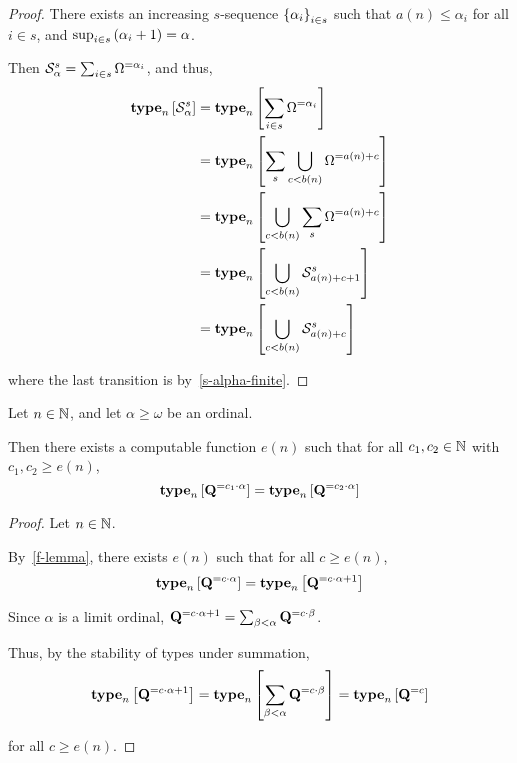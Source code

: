 \begin{proof}
    There exists an increasing $s$-sequence $\left\{ {\alpha_i} \right\}_{i \in s}$ such that
    $a(n) \le \alpha_i$ for all $i \in s$,
    and $\sup_{i \in s} \left( {\alpha_i + 1} \right) = \alpha$.

    Then $\mathcal{S}^{s}_{\alpha} = \sum_{i \in s} \Omega^{= \alpha_i}$,
    and thus,
    \begin{align*}
        \mathbf{type}_{n} \left[ {\mathcal{S}^{s}_{\alpha}} \right]
         & = \mathbf{type}_{n} \left[ {\sum_{i \in s} \Omega^{= \alpha_i}} \right]                   \\
         & = \mathbf{type}_{n} \left[ {\sum_{s} \bigcup_{c < b(n)}{\Omega^{= a(n) + c}}} \right]     \\
         & = \mathbf{type}_{n} \left[ {\bigcup_{c < b(n)}{\sum_{s} \Omega^{= a(n) + c}}} \right]     \\
         & = \mathbf{type}_{n} \left[ {\bigcup_{c < b(n)}{\mathcal{S}^{s}_{a(n) + c + 1}}} \right] \\
         & = \mathbf{type}_{n} \left[ {\bigcup_{c < b(n)}{\mathcal{S}^{s}_{a(n) + c}}} \right]     \\
    \end{align*}

    where the last transition is by~\cref{s-alpha-finite}.

\end{proof}

\begin{lemma}
    Let $n \in \mathbb{N}$, and let $\alpha \ge \omega$ be an ordinal.

    Then there exists a computable function $e(n)$ such that
    for all $c_1, c_2 \in \mathbb{N}$ with $c_1, c_2 \ge e(n)$,
    \[\mathbf{type}_{n} \left[ {\mathbf{Q}^{= c_1 \cdot \alpha}} \right] = \mathbf{type}_{n} \left[ {\mathbf{Q}^{= c_2 \cdot \alpha}} \right]\]
\end{lemma}

\begin{proof}
    Let $n \in \mathbb{N}$.

    By~\cref{f-lemma}, there exists $e(n)$ such that
    for all $c \ge e(n)$,
    \[\mathbf{type}_{n} \left[ {\mathbf{Q}^{= c \cdot \alpha}} \right] = \mathbf{type}_{n} \left[ {\mathbf{Q}^{= c \cdot \alpha + 1}} \right]\]

    Since $\alpha$ is a limit ordinal,
    $\mathbf{Q}^{= c \cdot \alpha + 1} = \sum_{\beta < \alpha}{\mathbf{Q}^{= c \cdot \beta}}$.

    Thus, by the stability of types under summation,
    \[\mathbf{type}_{n} \left[ {\mathbf{Q}^{= c \cdot \alpha + 1}} \right] = \mathbf{type}_{n} \left[ {\sum_{\beta < \alpha}{\mathbf{Q}^{= c \cdot \beta}}} \right] = \mathbf{type}_{n} \left[ {\mathbf{Q}^{= c}} \right]\]

    for all $c \ge e(n)$.
\end{proof}


